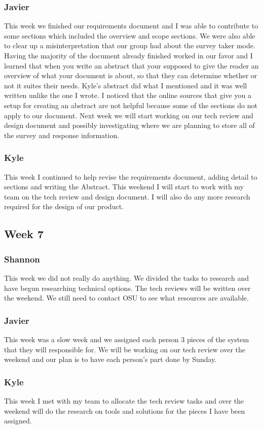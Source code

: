 \documentclass[letterpaper,10pt,serif, draftclsnofoot,onecolumn, compsoc, titlepage]{IEEEtran}
\begin{document}
\subsubsection{Javier}
This week we finished our requirements document and I was able to contribute to some sections which included the overview and scope sections. We were also able to clear up a misinterpretation that our group had about the survey taker mode. Having the majority of the document already finished worked in our favor and I learned that when you write an abstract that your supposed to give the reader an overview of what your document is about, so that they can determine whether or not it suites their needs. Kyle's abstract did what I mentioned and it was well written unlike the one I wrote. I noticed that the online sources that give you a setup for creating an abstract are not helpful because some of the sections do not apply to our document. Next week we will start working on our tech review and design document and possibly investigating where we are planning to store all of the survey and response information.
\subsubsection{Kyle}
This week I continued to help revise the requirements document, adding detail to sections and writing the Abstract. This weekend I will start to work with my team on the tech review and design document. I will also do any more research required for the design of our product.
\subsection{Week 7}
\subsubsection{Shannon}
This week we did not really do anything. We divided the tasks to research and have begun researching technical options. The tech reviews will be written over the weekend. We still need to contact OSU to see what resources are available.
\subsubsection{Javier}
This week was a slow week and we assigned each person 3 pieces of the system that they will responsible for. We will be working on our tech review over the weekend and our plan is to have each person's part done by Sunday.
\subsubsection{Kyle}
This week I met with my team to allocate the tech review tasks and over the weekend will do the research on tools and solutions for the pieces I have been assigned.
\end{document}
